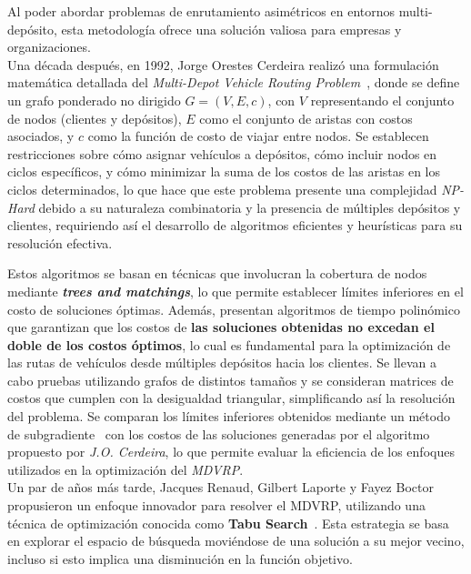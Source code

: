 \documentclass[letter, 10pt]{article}
\begin{document}
Al poder abordar problemas de enrutamiento asimétricos en entornos multi-depósito, esta metodología ofrece una solución valiosa para empresas y organizaciones.
\\

Una década después, en 1992, Jorge Orestes Cerdeira realizó una formulación matemática detallada del \textit{Multi-Depot Vehicle Routing Problem}~\cite{MultiDepotVehicleRouting}, donde se define un grafo ponderado no dirigido $G = (V, E, c)$, con $V$ representando el conjunto de nodos (clientes y depósitos), $E$ como el conjunto de aristas con costos asociados, y $c$ como la función de costo de viajar entre nodos. Se establecen restricciones sobre cómo asignar vehículos a depósitos, cómo incluir nodos en ciclos específicos, y cómo minimizar la suma de los costos de las aristas en los ciclos determinados, lo que hace que este problema presente una complejidad \textit{NP-Hard} debido a su naturaleza combinatoria y la presencia de múltiples depósitos y clientes, requiriendo así el desarrollo de algoritmos eficientes y heurísticas para su resolución efectiva.

Estos algoritmos se basan en técnicas que involucran la cobertura de nodos mediante \textbf{\textit{trees and matchings}}, lo que permite establecer límites inferiores en el costo de soluciones óptimas. Además, presentan algoritmos de tiempo polinómico que garantizan que los costos de \textbf{las soluciones obtenidas no excedan el doble de los costos óptimos}, lo cual es fundamental para la optimización de las rutas de vehículos desde múltiples depósitos hacia los clientes. Se llevan a cabo pruebas utilizando grafos de distintos tamaños y se consideran matrices de costos que cumplen con la desigualdad triangular, simplificando así la resolución del problema. Se comparan los límites inferiores obtenidos mediante un método de subgradiente~\cite{ValidationOfSubgradient} con los costos de las soluciones generadas por el algoritmo propuesto por \textit{J.O. Cerdeira}, lo que permite evaluar la eficiencia de los enfoques utilizados en la optimización del \textit{MDVRP}.
\\

Un par de años más tarde, Jacques Renaud, Gilbert Laporte y Fayez Boctor propusieron un enfoque innovador para resolver el MDVRP, utilizando una técnica de optimización conocida como \textbf{Tabu Search}~\cite{TabuSearchHeuristic}. Esta estrategia se basa en explorar el espacio de búsqueda moviéndose de una solución a su mejor vecino, incluso si esto implica una disminución en la función objetivo.
\end{document}

